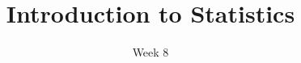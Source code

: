 \title{Introduction to Statistics}
\date{Week 8}





\thispagestyle{plain}

\graphicspath{{lectures/graphs/}}




